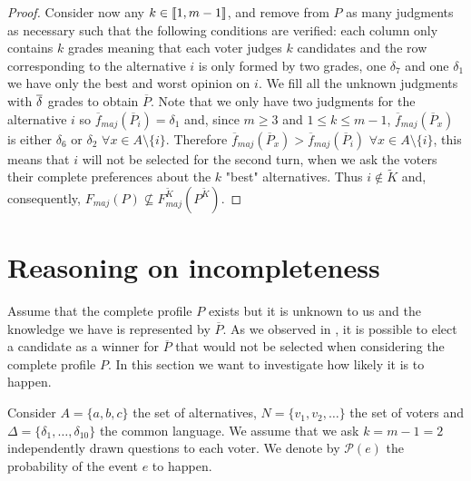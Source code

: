 \documentclass[version=3.21, pagesize, twoside=off, bibliography=totoc, DIV=calc, fontsize=12pt, a4paper]{scrartcl}
\begin{document}
\begin{proof}
	Consider now any $k \in \llbracket1,m-1\rrbracket$, and remove from $P$ as many judgments as necessary such that the following conditions are verified: each column only contains $k$ grades \textemdash meaning that each voter judges $k$ candidates \textemdash and the row corresponding to the alternative $i$ is only formed by two grades, one $\delta_7$ and one $\delta_1$ \textemdash we have only the best and worst opinion on $i$. We fill all the unknown judgments with $\overline{\delta}$ grades to obtain $\overline{P}$. Note that we only have two judgments for the alternative $i$ so $\overline{f}_{maj}(\overline{P}_i)=\delta_1$ and, since $m\geq3$ and $1 \leq k \leq m-1$, $\overline{f}_{maj}(\overline{P}_x)$ is either $\delta_6$ or $\delta_2$ $\forall x \in A \setminus \{i\}$. Therefore $\overline{f}_{maj}(\overline{P}_x) > \overline{f}_{maj}(\overline{P}_i)$ $\forall x \in A \setminus \{i\}$, this means that $i$ will not be selected for the second turn, when we ask the voters their complete preferences about the $k$ "best" alternatives. Thus $i \notin \tilde{K}$ and, consequently, $F_{maj}(P) \nsubseteq F^{\tilde{K}}_{maj}(P^{\tilde{K}})$.
\end{proof}


\section{Reasoning on incompleteness}

Assume that the complete profile $P$ exists but it  is unknown to us and the knowledge we have is represented by $\overline{P}$. As we observed in , it is possible to elect a candidate as a winner for $\overline{P}$ that would not be selected when considering the complete profile $P$. In this section we want to investigate how likely it is to happen.

Consider $A=\{a,b,c\}$ the set of alternatives, $N=\{v_1,v_2, \dots\}$ the set of voters and $\Delta=\{\delta_1, \dots, \delta_{10}\}$ the common language. We assume that we ask $k=m-1=2$ independently  drawn questions to each voter. We denote by $\mathcal{P}(e)$ the probability of the event $e$ to happen.

\end{document}
